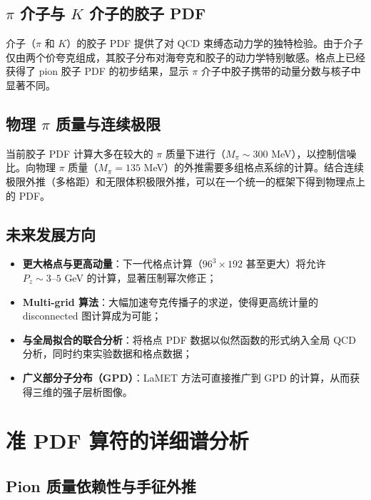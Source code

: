 \documentclass[11pt,a4paper]{ctexart}
\begin{document}
\subsection{$\pi$ 介子与 $K$ 介子的胶子 PDF}

介子（$\pi$ 和 $K$）的胶子 PDF 提供了对 QCD 束缚态动力学的独特检验。由于介子仅由两个价夸克组成，其胶子分布对海夸克和胶子的动力学特别敏感。格点上已经获得了 pion 胶子 PDF 的初步结果，显示 $\pi$ 介子中胶子携带的动量分数与核子中显著不同。

\subsection{物理 $\pi$ 质量与连续极限}

当前胶子 PDF 计算大多在较大的 $\pi$ 质量下进行（$M_\pi \sim 300$ MeV），以控制信噪比。向物理 $\pi$ 质量（$M_\pi = 135$ MeV）的外推需要多组格点系综的计算。结合连续极限外推（多格距）和无限体积极限外推，可以在一个统一的框架下得到物理点上的 PDF。

\subsection{未来发展方向}

\begin{itemize}
  \item \textbf{更大格点与更高动量}：下一代格点计算（$96^3 \times 192$ 甚至更大）将允许 $P_z \sim 3\text{--}5$ GeV 的计算，显著压制幂次修正；
  \item \textbf{Multi-grid 算法}：大幅加速夸克传播子的求逆，使得更高统计量的 disconnected 图计算成为可能；
  \item \textbf{与全局拟合的联合分析}：将格点 PDF 数据以似然函数的形式纳入全局 QCD 分析，同时约束实验数据和格点数据；
  \item \textbf{广义部分子分布（GPD）}：LaMET 方法可直接推广到 GPD 的计算，从而获得三维的强子层析图像。
\end{itemize}

\section{准 PDF 算符的详细谱分析}

\subsection{Pion 质量依赖性与手征外推}
\end{document}
